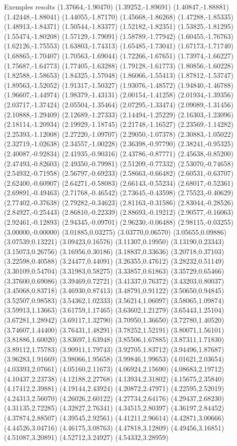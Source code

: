 \documentclass[11pt,a4paper]{article}
\begin{document}
\begin{fmex}{Exemples resolts}
(1.37664,-1.90470) (1.39252,-1.89691) (1.40847,-1.88881) (1.42448,-1.88041) (1.44055,-1.87170) (1.45668,-1.86268) (1.47288,-1.85335) (1.48913,-1.84371) (1.50544,-1.83377) (1.52182,-1.82351) (1.53825,-1.81295) (1.55474,-1.80208) (1.57129,-1.79091) (1.58789,-1.77942) (1.60455,-1.76763) (1.62126,-1.75553) (1.63803,-1.74313) (1.65485,-1.73041) (1.67173,-1.71740) (1.68865,-1.70407) (1.70563,-1.69044) (1.72266,-1.67651) (1.73974,-1.66227) (1.75687,-1.64773) (1.77405,-1.63288) (1.79128,-1.61773) (1.80856,-1.60228) (1.82588,-1.58653) (1.84325,-1.57048) (1.86066,-1.55413) (1.87812,-1.53747) (1.89563,-1.52052) (1.91317,-1.50327) (1.93076,-1.48572) (1.94840,-1.46788) (1.96607,-1.44974) (1.98379,-1.43131) (2.00154,-1.41258) (2.01934,-1.39356) (2.03717,-1.37424) (2.05504,-1.35464) (2.07295,-1.33474) (2.09089,-1.31456) (2.10888,-1.29409) (2.12689,-1.27333) (2.14494,-1.25229) (2.16303,-1.23096) (2.18114,-1.20934) (2.19929,-1.18745) (2.21748,-1.16527) (2.23569,-1.14282) (2.25393,-1.12008) (2.27220,-1.09707) (2.29050,-1.07378) (2.30883,-1.05022) (2.32719,-1.02638) (2.34557,-1.00228) (2.36398,-0.97790) (2.38241,-0.95325) (2.40087,-0.92834) (2.41935,-0.90316) (2.43786,-0.87771) (2.45638,-0.85200) (2.47493,-0.82603) (2.49350,-0.79981) (2.51209,-0.77332) (2.53070,-0.74658) (2.54932,-0.71958) (2.56797,-0.69233) (2.58663,-0.66482) (2.60531,-0.63707) (2.62400,-0.60907) (2.64271,-0.58083) (2.66143,-0.55234) (2.68017,-0.52361) (2.69891,-0.49463) (2.71768,-0.46542) (2.73645,-0.43598) (2.75523,-0.40629) (2.77402,-0.37638) (2.79282,-0.34623) (2.81163,-0.31586) (2.83044,-0.28526) (2.84927,-0.25443) (2.86810,-0.22339) (2.88693,-0.19212) (2.90577,-0.16063) (2.92461,-0.12893) (2.94345,-0.09701) (2.96230,-0.06488) (2.98115,-0.03255) (3.00000,-0.00000) (3.01885,0.03275) (3.03770,0.06570) (3.05655,0.09886) (3.07539,0.13221) (3.09423,0.16576) (3.11307,0.19950) (3.13190,0.23343) (3.15073,0.26756) (3.16956,0.30186) (3.18837,0.33636) (3.20718,0.37103) (3.22598,0.40588) (3.24477,0.44091) (3.26355,0.47612) (3.28232,0.51149) (3.30109,0.54704) (3.31983,0.58275) (3.33857,0.61863) (3.35729,0.65466) (3.37600,0.69086) (3.39469,0.72721) (3.41337,0.76372) (3.43203,0.80037) (3.45068,0.83718) (3.46930,0.87413) (3.48791,0.91122) (3.50650,0.94845) (3.52507,0.98583) (3.54362,1.02333) (3.56214,1.06097) (3.58065,1.09874) (3.59913,1.13663) (3.61759,1.17465) (3.63602,1.21279) (3.65443,1.25104) (3.67281,1.28942) (3.69117,1.32790) (3.70950,1.36650) (3.72780,1.40520) (3.74607,1.44400) (3.76431,1.48291) (3.78252,1.52191) (3.80071,1.56101) (3.81886,1.60020) (3.83697,1.63948) (3.85506,1.67885) (3.87311,1.71830) (3.89112,1.75783) (3.90911,1.79743) (3.92705,1.83712) (3.94496,1.87687) (3.96283,1.91669) (3.98066,1.95658) (3.99846,1.99653) (4.01621,2.03654) (4.03393,2.07661) (4.05160,2.11673) (4.06924,2.15690) (4.08683,2.19712) (4.10437,2.23738) (4.12188,2.27768) (4.13934,2.31802) (4.15675,2.35840) (4.17412,2.39881) (4.19144,2.43924) (4.20872,2.47971) (4.22595,2.52019) (4.24313,2.56070) (4.26026,2.60122) (4.27734,2.64176) (4.29437,2.68230) (4.31135,2.72285) (4.32827,2.76341) (4.34515,2.80397) (4.36197,2.84452) (4.37874,2.88507) (4.39545,2.92561) (4.41211,2.96614) (4.42871,3.00666) (4.44526,3.04716) (4.46175,3.08763) (4.47818,3.12809) (4.49456,3.16851) (4.51087,3.20891) (4.52712,3.24927) (4.54332,3.28959) 
\end{fmex}
\end{document}
